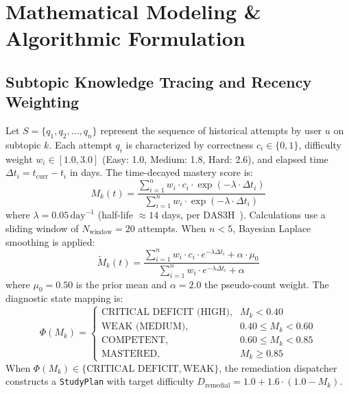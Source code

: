\documentclass[journal]{IEEEtran}
\begin{document}
\section{Mathematical Modeling \& Algorithmic Formulation}
\label{sec:mathematical_formulation}
\subsection{Subtopic Knowledge Tracing and Recency Weighting}
Let $S = \{q_1, q_2, \dots, q_n\}$ represent the sequence of historical attempts by user $u$ on subtopic $k$. Each attempt $q_i$ is characterized by correctness $c_i \in \{0, 1\}$, difficulty weight $w_i \in [1.0, 3.0]$ (Easy: 1.0, Medium: 1.8, Hard: 2.6), and elapsed time $\Delta t_i = t_{\text{curr}} - t_i$ in days. The time-decayed mastery score is:
\begin{equation}
M_k(t) = \frac{\sum_{i=1}^n w_i \cdot c_i \cdot \exp\left(-\lambda \cdot \Delta t_i\right)}{\sum_{i=1}^n w_i \cdot \exp\left(-\lambda \cdot \Delta t_i\right)}
\label{eq:mastery}
\end{equation}
where $\lambda = 0.05\,\text{day}^{-1}$ (half-life $\approx 14$ days, per DAS3H~\cite{choffin2019}). Calculations use a sliding window of $N_{\text{window}} = 20$ attempts. When $n < 5$, Bayesian Laplace smoothing is applied:
\begin{equation}
\tilde{M}_k(t) = \frac{\sum_{i=1}^n w_i \cdot c_i \cdot e^{-\lambda \Delta t_i} + \alpha \cdot \mu_0}{\sum_{i=1}^n w_i \cdot e^{-\lambda \Delta t_i} + \alpha}
\label{eq:smoothed_mastery}
\end{equation}
where $\mu_0 = 0.50$ is the prior mean and $\alpha = 2.0$ the pseudo-count weight. The diagnostic state mapping is:
\begin{equation}
\Phi(M_k) = \begin{cases}
\text{CRITICAL DEFICIT (HIGH)}, & M_k < 0.40 \\
\text{WEAK (MEDIUM)}, & 0.40 \le M_k < 0.60 \\
\text{COMPETENT}, & 0.60 \le M_k < 0.85 \\
\text{MASTERED}, & M_k \ge 0.85
\end{cases}
\label{eq:diagnostic_states}
\end{equation}
When $\Phi(M_k) \in \{\text{CRITICAL DEFICIT}, \text{WEAK}\}$, the remediation dispatcher constructs a \texttt{StudyPlan} with target difficulty $D_{\text{remedial}} = 1.0 + 1.6 \cdot (1.0 - M_k)$.
\end{document}
